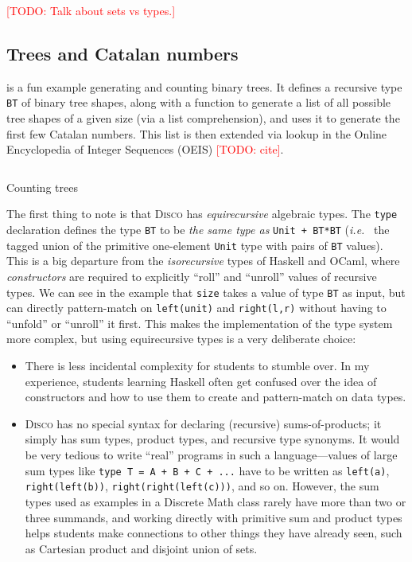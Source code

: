 \documentclass[submission,copyright,creativecommons]{eptcs}
\newcommand{\disco}{\textsc{Disco}\xspace}
\newcommand{\ie}{\emph{i.e.}\ }
\newcommand{\pref}[1]{\prettyref{#1}}
\newcommand{\todo}[1]{\textcolor{red}{[TODO: #1]}}
\newcommand{\todo}[1]{}
\begin{document}
\todo{Talk about sets vs types.}

\subsection{Trees and Catalan numbers}

\pref{lst:catalan} is a fun example generating and counting binary
trees. It defines a recursive type \texttt{BT} of binary tree shapes,
along with a function to generate a list of all possible tree shapes
of a given size (via a list comprehension), and uses it to generate
the first few Catalan numbers.  This list is then extended via lookup
in the Online Encyclopedia of Integer Sequences (OEIS) \todo{cite}.

\begin{listing}
  \inputminted{text}{examples/catalan.disco}
  \caption{Counting trees}
  \label{lst:catalan}
\end{listing}

The first thing to note is that \disco has \emph{equirecursive}
algebraic types.  The \texttt{type} declaration defines the type
\texttt{BT} to be \emph{the same type as} \texttt{Unit + BT*BT} (\ie
the tagged union of the primitive one-element \texttt{Unit} type with
pairs of \texttt{BT} values).  This is a big departure from the
\emph{isorecursive} types of Haskell and OCaml, where
\emph{constructors} are required to explicitly ``roll'' and ``unroll''
values of recursive types.  We can see in the example that
\texttt{size} takes a value of type \texttt{BT} as input, but can
directly pattern-match on \texttt{left(unit)} and \texttt{right(l,r)}
without having to ``unfold'' or ``unroll'' it first.  This makes the
implementation of the type system more complex, but using
equirecursive types is a very deliberate choice:
\begin{itemize}
\item There is less incidental complexity for students to stumble
  over.  In my experience, students learning Haskell often get
  confused over the idea of constructors and how to use them to create
  and pattern-match on data types.
\item \disco has no special syntax for declaring
  (recursive) sums-of-products; it simply has sum types, product
  types, and recursive type synonyms. It would be very tedious to
  write ``real'' programs in such a language---values of large sum
  types like \texttt{type T = A + B + C + ...} have to be written as
  \texttt{left(a)}, \texttt{right(left(b))},
  \texttt{right(right(left(c)))}, and so on. However, the sum types
  used as examples in a Discrete Math class rarely have more than two
  or three summands, and working directly with primitive sum and
  product types helps students make connections to other things they
  have already seen, such as Cartesian product and disjoint union of sets.
\end{itemize}
\end{document}
